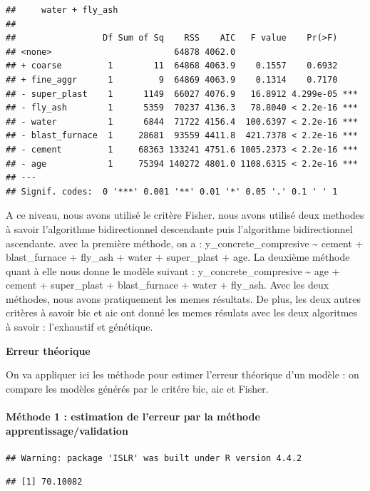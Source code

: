 \documentclass[
  12pt,
]{article}
\begin{document}
\begin{verbatim}
##     water + fly_ash
## 
##                 Df Sum of Sq    RSS    AIC   F value    Pr(>F)    
## <none>                        64878 4062.0                        
## + coarse         1        11  64868 4063.9    0.1557    0.6932    
## + fine_aggr      1         9  64869 4063.9    0.1314    0.7170    
## - super_plast    1      1149  66027 4076.9   16.8912 4.299e-05 ***
## - fly_ash        1      5359  70237 4136.3   78.8040 < 2.2e-16 ***
## - water          1      6844  71722 4156.4  100.6397 < 2.2e-16 ***
## - blast_furnace  1     28681  93559 4411.8  421.7378 < 2.2e-16 ***
## - cement         1     68363 133241 4751.6 1005.2373 < 2.2e-16 ***
## - age            1     75394 140272 4801.0 1108.6315 < 2.2e-16 ***
## ---
## Signif. codes:  0 '***' 0.001 '**' 0.01 '*' 0.05 '.' 0.1 ' ' 1
\end{verbatim}

A ce niveau, nous avons utilisé le critère Fisher. nous avons utilisé
deux methodes à savoir l'algorithme bidirectionnel descendante puis
l'algorithme bidirectionnel ascendante. avec la première méthode, on a :
y\_concrete\_compresive \textasciitilde{} cement + blast\_furnace +
fly\_ash + water + super\_plast + age. La deuxième méthode quant à elle
nous donne le modèle suivant : y\_concrete\_compresive \textasciitilde{}
age + cement + super\_plast + blast\_furnace + water + fly\_ash. Avec
les deux méthodes, nous avons pratiquement les memes résultats. De plus,
les deux autres critères à savoir bic et aic ont donné les memes
résulats avec les deux algoritmes à savoir : l'exhaustif et génétique.

\textbf{Erreur théorique}

On va appliquer ici les méthode pour estimer l'erreur théorique d'un
modèle : on compare les modèles générés par le critére bic, aic et
Fisher.

\paragraph{Méthode 1 : estimation de l'erreur par la méthode
apprentissage/validation}\label{muxe9thode-1-estimation-de-lerreur-par-la-muxe9thode-apprentissagevalidation}

\begin{verbatim}
## Warning: package 'ISLR' was built under R version 4.4.2
\end{verbatim}

\begin{verbatim}
## [1] 70.10082
\end{verbatim}
\end{document}
